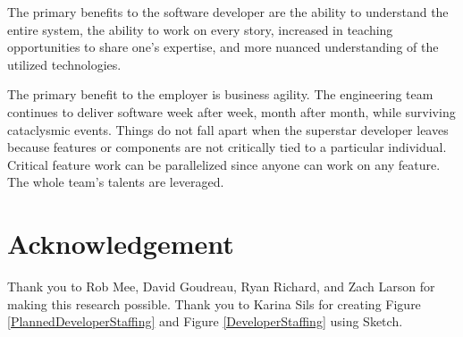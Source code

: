 The primary benefits to the software developer are the ability to understand the entire system, the ability to work on every story, increased in teaching opportunities to share one's expertise, and more nuanced understanding of the utilized technologies. 

The primary benefit to the employer is business agility. The engineering team continues to deliver software week after week, month after month, while surviving cataclysmic events. Things do not fall apart when the superstar developer leaves because features or components are not critically tied to a particular individual. Critical feature work can be parallelized since anyone can work on any feature.  The whole team's talents are leveraged.

\section{Acknowledgement}

Thank you to Rob Mee, David Goudreau, Ryan Richard, and Zach Larson for making this research possible. Thank you to Karina Sils for creating Figure \ref{PlannedDeveloperStaffing} and Figure \ref{DeveloperStaffing} using Sketch.


